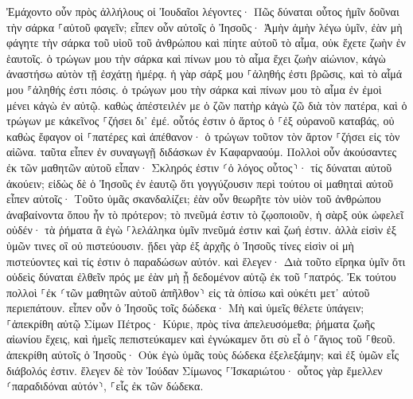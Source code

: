 \documentclass[twoside, 9pt]{extreport}
\begin{document}
Ἐμάχοντο οὖν πρὸς ἀλλήλους οἱ Ἰουδαῖοι λέγοντες· Πῶς δύναται οὗτος ἡμῖν δοῦναι τὴν σάρκα ⸀αὐτοῦ φαγεῖν; 
εἶπεν οὖν αὐτοῖς ὁ Ἰησοῦς· Ἀμὴν ἀμὴν λέγω ὑμῖν, ἐὰν μὴ φάγητε τὴν σάρκα τοῦ υἱοῦ τοῦ ἀνθρώπου καὶ πίητε αὐτοῦ τὸ αἷμα, οὐκ ἔχετε ζωὴν ἐν ἑαυτοῖς. 
ὁ τρώγων μου τὴν σάρκα καὶ πίνων μου τὸ αἷμα ἔχει ζωὴν αἰώνιον, κἀγὼ ἀναστήσω αὐτὸν τῇ ἐσχάτῃ ἡμέρᾳ. 
ἡ γὰρ σάρξ μου ⸀ἀληθής ἐστι βρῶσις, καὶ τὸ αἷμά μου ⸁ἀληθής ἐστι πόσις. 
ὁ τρώγων μου τὴν σάρκα καὶ πίνων μου τὸ αἷμα ἐν ἐμοὶ μένει κἀγὼ ἐν αὐτῷ. 
καθὼς ἀπέστειλέν με ὁ ζῶν πατὴρ κἀγὼ ζῶ διὰ τὸν πατέρα, καὶ ὁ τρώγων με κἀκεῖνος ⸀ζήσει δι᾽ ἐμέ. 
οὗτός ἐστιν ὁ ἄρτος ὁ ⸀ἐξ οὐρανοῦ καταβάς, οὐ καθὼς ἔφαγον οἱ ⸀πατέρες καὶ ἀπέθανον· ὁ τρώγων τοῦτον τὸν ἄρτον ⸀ζήσει εἰς τὸν αἰῶνα. 
ταῦτα εἶπεν ἐν συναγωγῇ διδάσκων ἐν Καφαρναούμ. 
Πολλοὶ οὖν ἀκούσαντες ἐκ τῶν μαθητῶν αὐτοῦ εἶπαν· Σκληρός ἐστιν ⸂ὁ λόγος οὗτος⸃· τίς δύναται αὐτοῦ ἀκούειν; 
εἰδὼς δὲ ὁ Ἰησοῦς ἐν ἑαυτῷ ὅτι γογγύζουσιν περὶ τούτου οἱ μαθηταὶ αὐτοῦ εἶπεν αὐτοῖς· Τοῦτο ὑμᾶς σκανδαλίζει; 
ἐὰν οὖν θεωρῆτε τὸν υἱὸν τοῦ ἀνθρώπου ἀναβαίνοντα ὅπου ἦν τὸ πρότερον; 
τὸ πνεῦμά ἐστιν τὸ ζῳοποιοῦν, ἡ σὰρξ οὐκ ὠφελεῖ οὐδέν· τὰ ῥήματα ἃ ἐγὼ ⸀λελάληκα ὑμῖν πνεῦμά ἐστιν καὶ ζωή ἐστιν. 
ἀλλὰ εἰσὶν ἐξ ὑμῶν τινες οἳ οὐ πιστεύουσιν. ᾔδει γὰρ ἐξ ἀρχῆς ὁ Ἰησοῦς τίνες εἰσὶν οἱ μὴ πιστεύοντες καὶ τίς ἐστιν ὁ παραδώσων αὐτόν. 
καὶ ἔλεγεν· Διὰ τοῦτο εἴρηκα ὑμῖν ὅτι οὐδεὶς δύναται ἐλθεῖν πρός με ἐὰν μὴ ᾖ δεδομένον αὐτῷ ἐκ τοῦ ⸀πατρός. 
Ἐκ τούτου πολλοὶ ⸀ἐκ ⸂τῶν μαθητῶν αὐτοῦ ἀπῆλθον⸃ εἰς τὰ ὀπίσω καὶ οὐκέτι μετ᾽ αὐτοῦ περιεπάτουν. 
εἶπεν οὖν ὁ Ἰησοῦς τοῖς δώδεκα· Μὴ καὶ ὑμεῖς θέλετε ὑπάγειν; 
⸀ἀπεκρίθη αὐτῷ Σίμων Πέτρος· Κύριε, πρὸς τίνα ἀπελευσόμεθα; ῥήματα ζωῆς αἰωνίου ἔχεις, 
καὶ ἡμεῖς πεπιστεύκαμεν καὶ ἐγνώκαμεν ὅτι σὺ εἶ ὁ ⸀ἅγιος τοῦ ⸀θεοῦ. 
ἀπεκρίθη αὐτοῖς ὁ Ἰησοῦς· Οὐκ ἐγὼ ὑμᾶς τοὺς δώδεκα ἐξελεξάμην; καὶ ἐξ ὑμῶν εἷς διάβολός ἐστιν. 
ἔλεγεν δὲ τὸν Ἰούδαν Σίμωνος ⸀Ἰσκαριώτου· οὗτος γὰρ ἔμελλεν ⸂παραδιδόναι αὐτόν⸃, ⸀εἷς ἐκ τῶν δώδεκα. 
\end{document}
